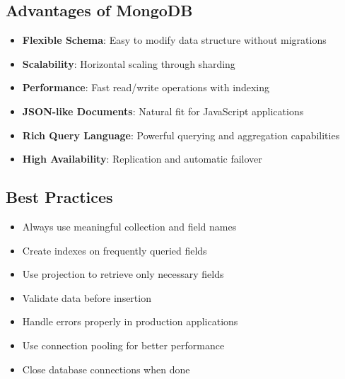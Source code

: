 \documentclass[12pt,a4paper]{article}
\begin{document}
\subsection{Advantages of MongoDB}

\begin{itemize}
    \item \textbf{Flexible Schema}: Easy to modify data structure without migrations
    \item \textbf{Scalability}: Horizontal scaling through sharding
    \item \textbf{Performance}: Fast read/write operations with indexing
    \item \textbf{JSON-like Documents}: Natural fit for JavaScript applications
    \item \textbf{Rich Query Language}: Powerful querying and aggregation capabilities
    \item \textbf{High Availability}: Replication and automatic failover
\end{itemize}

\subsection{Best Practices}

\begin{itemize}
    \item Always use meaningful collection and field names
    \item Create indexes on frequently queried fields
    \item Use projection to retrieve only necessary fields
    \item Validate data before insertion
    \item Handle errors properly in production applications
    \item Use connection pooling for better performance
    \item Close database connections when done
\end{itemize}
\end{document}
